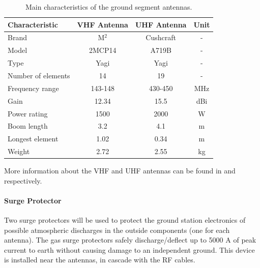 \begin{table}[ht]
    \centering
    \begin{tabular}{lccc}
        \toprule[1.5pt]
        \textbf{Characteristic} & \textbf{VHF Antenna}  & \textbf{UHF Antenna}  & \textbf{Unit} \\
        \midrule
        Brand                   & M$^{2}$               & Cushcraft             & - \\
        Model                   & 2MCP14                & A719B                 & - \\
        Type                    & Yagi                  & Yagi                  & - \\
        Number of elements      & 14                    & 19                    & - \\
        Frequency range         & 143-148               & 430-450               & MHz \\
        Gain                    & 12.34                 & 15.5                  & dBi \\
        Power rating            & 1500                  & 2000                  & W \\
        Boom length             & 3.2                   & 4.1                   & m \\
        Longest element         & 1.02                  & 0.34                  & m \\
        Weight                  & 2.72                  & 2.55                  & kg \\
        \bottomrule[1.5pt]
    \end{tabular}
    \caption{Main characteristics of the ground segment antennas.}
    \label{tab:grs-antennas}
\end{table}

More information about the VHF and UHF antennas can be found in \cite{2mcp14} and \cite{a719b} respectively.

\paragraph{Surge Protector}

Two surge protectors will be used to protect the ground station electronics of possible atmospheric discharges in the outside components (one for each antenna). The gas surge protectors safely discharge/deflect up to 5000 A of peak current to earth without causing damage to an independent ground. This device is installed near the antennas, in cascade with the RF cables.

